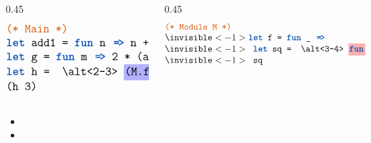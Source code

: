 \begin{frame}

  \Large
  \begin{columns}[t]
    \begin{column}{0.45\textwidth}
      \[
      \large
      \begin{array}{@{}ll@{}}
        \mex{\textcolor{dkcomment}{(* Main *)}}\\
        \mex{\kw{let} add1 = \kw{fun} n \codearr n + 1 \kw{in}} \\
        \mex{\kw{let} g = \kw{fun} m \codearr 2 * (add1 m) \kw{in}} \\
        \mex{\kw{let} h = \altcolor{2-3}{blue}{(M.f g)} \kw{in}} \\
        \mex{(h 3)}
      \end{array}
      \]
    \end{column}

    \begin{column}{0.45\textwidth}
      \[
      \large
      \begin{array}{@{}ll@{}}
        \mex{\textcolor{dkcomment}{(* Module M *)}}\\
        \invisible<-1>{\mex{\kw{let} f = \kw{fun} \_ \codearr}}\\
        \invisible<-1>{\mex{                      \kw{let} sq = \altcolor{3-4}{red}{\kw{fun} x \codearr x * x} \kw{in}}}\\
        \invisible<-1>{\mex{                      sq}}
      \end{array}
      \]
    \end{column}
  \end{columns}

  \vspace{1em}

  \begin{itemize}
  \item {}
  \item {}
  \end{itemize}


\end{frame}

